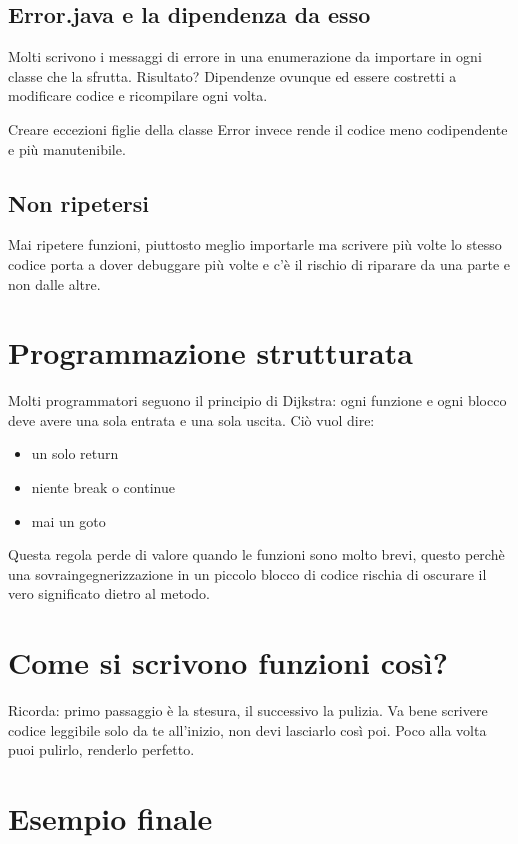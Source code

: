 \documentclass[11pt,a4paper]{book}
\begin{document}
\subsection{Error.java e la dipendenza da esso}
Molti scrivono i messaggi di errore in una enumerazione da importare in ogni classe che la sfrutta. Risultato? Dipendenze ovunque ed essere costretti a modificare codice e ricompilare ogni volta.

Creare eccezioni figlie della classe Error invece rende il codice meno codipendente e più manutenibile.

\subsection{Non ripetersi}
Mai ripetere funzioni, piuttosto meglio importarle ma scrivere più volte lo stesso codice porta a dover debuggare più volte e c'è il rischio di riparare da una parte e non dalle altre.

\section{Programmazione strutturata}
Molti programmatori seguono il principio di Dijkstra: ogni funzione e ogni blocco deve avere una sola entrata e una sola uscita. Ciò vuol dire:
\begin{itemize}
	\item un solo return
	\item niente break o continue
	\item mai un goto
\end{itemize}

Questa regola perde di valore quando le funzioni sono molto brevi, questo perchè una sovraingegnerizzazione in un piccolo blocco di codice rischia di oscurare il vero significato dietro al metodo.

\section{Come si scrivono funzioni così?}
Ricorda: primo passaggio è la stesura, il successivo la pulizia. Va bene scrivere codice leggibile solo da te all'inizio, non devi lasciarlo così poi. Poco alla volta puoi pulirlo, renderlo perfetto.

\section{Esempio finale}
\label{code: 022}
\end{document}

